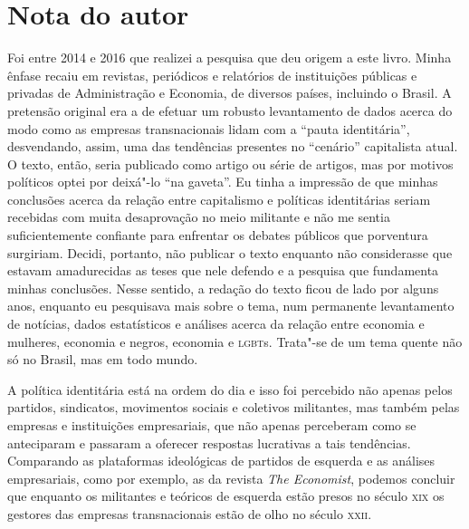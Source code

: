 \chapter{Nota do autor}

Foi entre 2014 e 2016 que realizei a pesquisa que deu origem a este
livro. Minha ênfase recaiu em revistas, periódicos e relatórios de
instituições públicas e privadas de Administração e Economia, de
diversos países, incluindo o Brasil. A pretensão original era a de
efetuar um robusto levantamento de dados acerca do modo como as empresas
transnacionais lidam com a ``pauta identitária'', desvendando, assim,
uma das tendências presentes no ``cenário'' capitalista atual. O texto,
então, seria publicado como artigo ou série de artigos, mas por motivos
políticos optei por deixá"-lo ``na gaveta''. Eu tinha a impressão de que
minhas conclusões acerca da relação entre capitalismo e políticas
identitárias seriam recebidas com muita desaprovação no meio militante e
não me sentia suficientemente confiante para enfrentar os debates
públicos que porventura surgiriam. Decidi, portanto, não publicar o
texto enquanto não considerasse que estavam amadurecidas as teses que
nele defendo e a pesquisa que fundamenta minhas conclusões. Nesse
sentido, a redação do texto ficou de lado por alguns anos, enquanto eu
pesquisava mais sobre o tema, num permanente levantamento de notícias,
dados estatísticos e análises acerca da relação entre economia e
mulheres, economia e negros, economia e \textsc{lgbt}s. Trata"-se de um tema
quente não só no Brasil, mas em todo mundo.

A política identitária está na ordem do dia e isso foi percebido não
apenas pelos partidos, sindicatos, movimentos sociais e coletivos
militantes, mas também pelas empresas e instituições empresariais, que
não apenas perceberam como se anteciparam e passaram a oferecer
respostas lucrativas a tais tendências. Comparando as plataformas
ideológicas de partidos de esquerda e as análises empresariais, como por
exemplo, as da revista \emph{The Economist}, podemos concluir que
enquanto os militantes e teóricos de esquerda estão presos no século \textsc{xix}
os gestores das empresas transnacionais estão de olho no século \textsc{xxii}.

